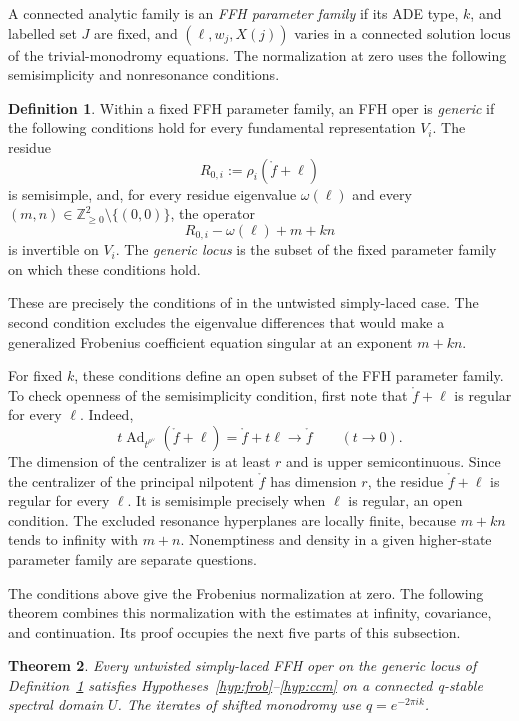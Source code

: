 \documentclass[11pt,leqno]{amsart}
\numberwithin{equation}{section}
\theoremstyle{plain}
\newtheorem{theorem}{Theorem}[section]
\theoremstyle{definition}
\newtheorem{definition}[theorem]{Definition}
\theoremstyle{plain}
\theoremstyle{definition}
\theoremstyle{remark}
\begin{document}
A connected analytic family is an \emph{FFH parameter family} if its ADE type, $k$, and labelled set $J$ are fixed, and $(\ell,w_j,X(j))$ varies in a connected solution locus of the trivial-monodromy equations.  The normalization at zero uses the following semisimplicity and nonresonance conditions.
\begin{definition}\label{def:generic-FFH-data}
Within a fixed FFH parameter family, an FFH oper is \emph{generic} if the following conditions hold for every fundamental representation $V_i$.  The residue
\[
 R_{0,i}:=\rho_i(\mathring f+\ell)
\]
is semisimple, and, for every residue eigenvalue $\omega(\ell)$ and every $(m,n)\in\mathbb Z_{\ge0}^2\setminus\{(0,0)\}$, the operator
\[
 R_{0,i}-\omega(\ell)+m+kn
\]
is invertible on $V_i$.  The \emph{generic locus} is the subset of the fixed parameter family on which these conditions hold.
\end{definition}
These are precisely the conditions of \cite[Definition~3.13]{MR2024} in the untwisted simply-laced case.  The second condition excludes the eigenvalue differences that would make a generalized Frobenius coefficient equation singular at an exponent $m+kn$.

For fixed $k$, these conditions define an open subset of the FFH parameter family.  To check openness of the semisimplicity condition, first note that $\mathring f+\ell$ is regular for every $\ell$.  Indeed,
\[
 t\operatorname{Ad}_{t^{\rho^\vee}}(\mathring f+\ell)
 =\mathring f+t\ell\longrightarrow\mathring f
 \qquad(t\longrightarrow0).
\]
The dimension of the centralizer is at least $r$ and is upper semicontinuous.  Since the centralizer of the principal nilpotent $\mathring f$ has dimension $r$, the residue $\mathring f+\ell$ is regular for every $\ell$.  It is semisimple precisely when $\ell$ is regular, an open condition.  The excluded resonance hyperplanes are locally finite, because $m+kn$ tends to infinity with $m+n$.  Nonemptiness and density in a given higher-state parameter family are separate questions.

The conditions above give the Frobenius normalization at zero.  The following theorem combines this normalization with the estimates at infinity, covariance, and continuation.  Its proof occupies the next five parts of this subsection.


\begin{theorem}\label{thm:FFH-verification}
Every untwisted simply-laced FFH oper on the generic locus of Definition~\ref{def:generic-FFH-data} satisfies Hypotheses~\ref{hyp:frob}--\ref{hyp:ccm} on a connected q-stable spectral domain $U$.  The iterates of shifted monodromy use $q=e^{-2\pi ik}$.
\end{theorem}
\end{document}
